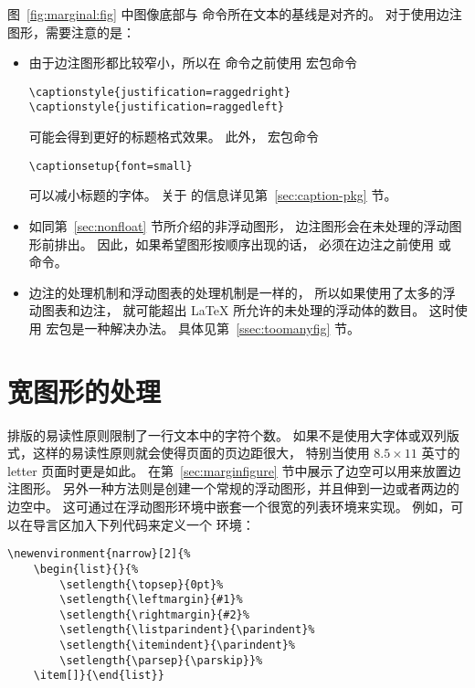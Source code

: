 图~\ref{fig:marginal:fig} 中图像底部与  命令所在文本的基线是对齐的。
对于使用边注图形，需要注意的是：
\begin{itemize}	
	\item 由于边注图形都比较窄小，所以在  命令之前使用  宏包命令
\begin{lstlisting}
\captionstyle{justification=raggedright}
\captionstyle{justification=raggedleft}
\end{lstlisting}
	可能会得到更好的标题格式效果。
	此外， 宏包命令
\begin{lstlisting}
\captionsetup{font=small}
\end{lstlisting}
	可以减小标题的字体。
	关于  的信息详见第~\ref{sec:caption-pkg} 节。
	
	\item 如同第~\ref{sec:nonfloat} 节所介绍的非浮动图形，
	边注图形会在未处理的浮动图形前排出。
	因此，如果希望图形按顺序出现的话，
	必须在边注之前使用  或  命令。
	
	\item 边注的处理机制和浮动图表的处理机制是一样的，
	所以如果使用了太多的浮动图表和边注，
	就可能超出 \LaTeX{} 所允许的未处理的浮动体的数目。
	这时使用  宏包是一种解决办法。
	具体见第~\ref{ssec:toomanyfig} 节。
\end{itemize}      

\section{宽图形的处理} \label{sec:widefig}

排版的易读性原则限制了一行文本中的字符个数。
如果不是使用大字体或双列版式，这样的易读性原则就会使得页面的页边距很大，
特别当使用 $8.5\times 11 $ 英寸的 letter 页面时更是如此。
在第~\ref{sec:marginfigure} 节中展示了边空可以用来放置边注图形。
另外一种方法则是创建一个常规的浮动图形，并且伸到一边或者两边的边空中。
这可通过在浮动图形环境中嵌套一个很宽的列表环境来实现。
例如，可以在导言区加入下列代码来定义一个  环境：
\begin{lstlisting}
\newenvironment{narrow}[2]{%
	\begin{list}{}{%
		\setlength{\topsep}{0pt}%
		\setlength{\leftmargin}{#1}%
		\setlength{\rightmargin}{#2}%
		\setlength{\listparindent}{\parindent}%
		\setlength{\itemindent}{\parindent}%
		\setlength{\parsep}{\parskip}}%
	\item[]}{\end{list}}
\end{lstlisting}

